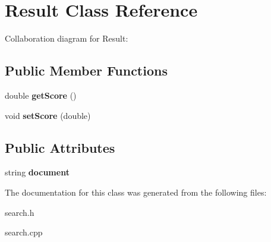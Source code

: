 \hypertarget{classResult}{}\section{Result Class Reference}
\label{classResult}


Collaboration diagram for Result\+:
\subsection*{Public Member Functions}
\begin{DoxyCompactItemize}
\item 
double {\bfseries get\+Score} ()\hypertarget{classResult_afe2ad86bd3204f3bf902f45b5b4ef5b6}{}\label{classResult_afe2ad86bd3204f3bf902f45b5b4ef5b6}

\item 
void {\bfseries set\+Score} (double)\hypertarget{classResult_a6e6f3f1d7eead3d97af932117b8c80d5}{}\label{classResult_a6e6f3f1d7eead3d97af932117b8c80d5}

\end{DoxyCompactItemize}
\subsection*{Public Attributes}
\begin{DoxyCompactItemize}
\item 
string {\bfseries document}\hypertarget{classResult_afb2d9dccfdbb4f147a26a496b8757dc5}{}\label{classResult_afb2d9dccfdbb4f147a26a496b8757dc5}

\end{DoxyCompactItemize}


The documentation for this class was generated from the following files\+:\begin{DoxyCompactItemize}
\item 
search.\+h\item 
search.\+cpp\end{DoxyCompactItemize}
